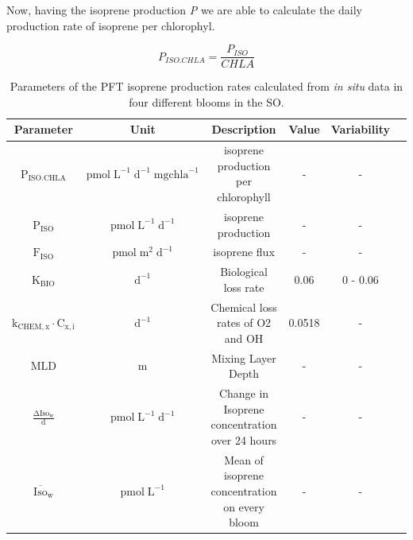 \documentclass[draft,linenumbers]{agujournal}
\begin{document}
Now, having the isoprene production \textit{P} we are able to calculate the daily production rate of isoprene per chlorophyl.\\

\begin{linenomath*}
\begin{equation}
P_{ISO.CHLA} = \frac{P_{ISO}}{CHLA}
\end{equation}
\end{linenomath*}

\begin{center}
\begin{table}[h!]
\centering
\caption{Parameters of the PFT isoprene production rates calculated from \textit{in situ} data in four different blooms in the SO.}
\label{tab:pegrates}
\begin{tabular}[ht]{ c|c|c|c|c|c } 

 \textbf{Parameter} & \textbf{Unit} & \textbf{Description} & \textbf{Value} & \textbf{Variability} \\\hline
 $\mathrm{P_{ISO.CHLA}}$   &  $\mathrm{pmol} \; \mathrm{L}^{\mathrm{-1}} \; \mathrm{d}^{\mathrm{-1}}\; \mathrm{mg chla}^{\mathrm{-1}}$  & \tiny{isoprene production per chlorophyll} &  -  & -  \\

 $\mathrm{P_{ISO}}$   &  $\mathrm{pmol} \; \mathrm{L}^{\mathrm{-1}} \; \mathrm{d}^{\mathrm{-1}}$  & \tiny{isoprene production} &  -  & - \\

$\mathrm{F_{ISO}}$     & $\mathrm{pmol} \; \mathrm{m}^{\mathrm{2}} \; \mathrm{d}^{\mathrm{-1}}$   & \tiny{isoprene flux} & - & -  \\

$\mathrm{K}_{\mathrm{BIO}}$ & $\mathrm{d}^{\mathrm{-1}}$ & \tiny{Biological loss rate} & 0.06 & 0 - 0.06 \\

$\mathrm{k}_{\mathrm{CHEM, x}} \cdot \mathrm{C}_{\mathrm{x, i}}$ & $\mathrm{d}^{\mathrm{-1}}$ & \tiny{Chemical loss rates of O2 and OH } & 0.0518 & -  \\

$\mathrm{MLD}$ & m & \tiny{Mixing Layer Depth} & - & - \\

$\mathrm{\frac{ΔIso_{w}}{d}}$ &  $\mathrm{pmol} \; \mathrm{L}^{\mathrm{-1}} \; \mathrm{d}^{\mathrm{-1}}$ & \tiny{Change in Isoprene concentration over 24 hours} & - & - \\

$\mathrm{\overline{Iso}_{w}}$ &  $\mathrm{pmol} \; \mathrm{L}^{\mathrm{-1}}$ & \tiny{Mean of isoprene concentration on every bloom} & - & - \\

\end{tabular}
\end{table}
\end{center}
\end{document}
